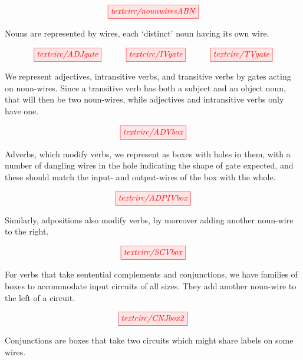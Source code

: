 
\begin{marginfigure}
\centering
\[
\tikzfig{textcirc/nounwiresABN} 
\]
\caption{Nouns are represented by wires, each `distinct' noun having its own wire.}
\end{marginfigure}

\begin{marginfigure}
\centering
\[
\tikzfig{textcirc/ADJgate} \quad\quad\quad \tikzfig{textcirc/IVgate} \quad\quad\quad \tikzfig{textcirc/TVgate}
\]
\caption{We represent adjectives, intransitive verbs, and transitive verbs by gates acting on noun-wires. Since a transitive verb has both a subject and an object noun, that will then be two noun-wires, while adjectives and intransitive verbs only have one.}
\end{marginfigure}

\begin{marginfigure}
\centering
\[
\tikzfig{textcirc/ADVbox}
\]
\caption{Adverbs, which modify verbs, we represent as boxes with holes in them, with a number of dangling wires in the hole indicating the shape of gate expected, and these should match the input- and output-wires  of the box with the whole.}
\end{marginfigure}

\begin{marginfigure}
\centering
\[
\tikzfig{textcirc/ADPIVbox}
\]  
\caption{Similarly, adpositions also modify verbs, by moreover adding another noun-wire to the right.}
\end{marginfigure}

\begin{marginfigure}
\centering
\[
\tikzfig{textcirc/SCVbox}
\]
\caption{For verbs that take sentential complements and conjunctions, we have families of boxes to accommodate input circuits of all sizes. They add another noun-wire to the left of a circuit.}
\end{marginfigure}

\begin{marginfigure}
\centering
\[
\tikzfig{textcirc/CNJbox2}
\]
\caption{Conjunctions are boxes that take two circuits which might share labels on some wires.}
\end{marginfigure}

